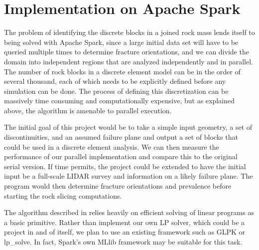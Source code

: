 \documentclass[american]{article}
\begin{document}
\section{Implementation on Apache Spark}
The problem of identifying the discrete blocks in a joined rock mass lends itself to being solved with Apache Spark, since a large initial data set will have to be queried multiple times to determine fracture orientations, and we can divide the domain into independent regions that are analyzed independently and in parallel. The number of rock blocks in a discrete element model can be in the order of  several thousand, each of which needs to be explicitly defined before any simulation can be done. The process of defining this discretization can be massively time consuming and computationally expensive, but as explained above, the algorithm is amenable to parallel execution.

The initial goal of this project would be to take a simple input geometry, a set of discontinuities, and an assumed failure plane and output a set of blocks that could be used in a discrete element analysis. We can then measure the performance of our parallel implementation and compare this to the original serial version. If time permits, the project could be extended to have the initial input be a full-scale LIDAR survey and information on a likely failure plane. The program would then determine fracture orientations and prevalence before starting the rock slicing computations.

The algorithm described in \textcite{Collision} relies heavily on efficient solving of linear programs as a basic primitive. Rather than implement our own LP solver, which could be a project in and of itself, we plan to use an existing framework such as GLPK or lp\_solve. In fact, Spark's own MLlib framework may be suitable for this task.

\clearpage
\nocite{*}
\printbibliography
\end{document}
